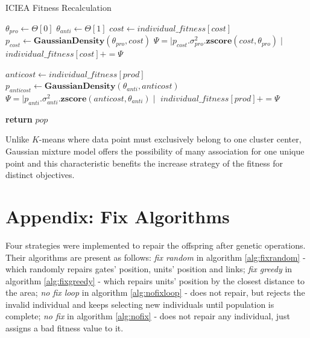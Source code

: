 \documentclass{llncs}
\begin{document}
\begin{algorithm}
\caption{ICIEA Fitness Recalculation}
\label{alg:icieafitness}
\begin{algorithmic}[1]
\State $\theta_{pro}\gets\Theta[0] $
\State $\theta_{anti}\gets\Theta[1] $
	\State $cost \gets individual\_fitness[cost]$
	\State $p_{cost} \gets \textbf{GaussianDensity}(\theta_{pro},cost)$
	\State $ \Psi= \mid p_{cost}.\sigma_{pro}^2.\textbf{zscore}(cost,\theta_{pro})\mid$
	\State $individual\_fitness[cost] += \Psi$
	\State

	\State $anticost \gets individual\_fitness[prod]$
	\State $p_{anticost} \gets \textbf{GaussianDensity}(\theta_{anti},anticost)$
	\State $ \Psi= \mid p_{anti}.\sigma_{anti}^2.\textbf{zscore}(anticost,\theta_{anti})\mid $
	\State $individual\_fitness[prod] += \Psi$

\EndFor

\State \textbf{return} $pop$
\EndProcedure
\end{algorithmic}
\end{algorithm}

\FloatBarrier


Unlike $K$-means where data point must exclusively belong to one cluster center, Gaussian mixture model offers the possibility of many association for one unique point and this characteristic benefits the increase strategy of the fitness for distinct objectives.



 
 

\newpage
\appendix
\section{Appendix: Fix Algorithms}\label{sec:fix}
Four strategies were implemented to repair the offspring after genetic operations. Their algorithms are present as follows: \textit{fix random} in algorithm \ref{alg:fixrandom} - which randomly repairs gates' position, units' position and links; \textit{fix greedy} in algorithm \ref{alg:fixgreedy} - which repairs units' position by the closest distance to the area; \textit{no fix loop} in algorithm \ref{alg:nofixloop} - does not repair, but rejects the invalid individual and keeps selecting new individuals until population is complete; \textit{no fix} in algorithm \ref{alg:nofix} - does not repair any individual, just assigns a bad fitness value to it.  
\end{document}
